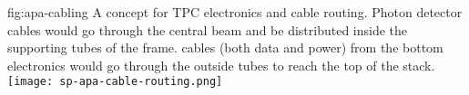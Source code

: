 \begin{dunefigure}{fig:apa-cabling}
{%
A concept for TPC electronics and  cable routing. Photon detector cables would go through the central beam and be distributed inside the supporting tubes of the  frame.   cables (both data and power) from the bottom  electronics would go through the outside tubes to reach the top of the stack.}
\texttt{[image: sp-apa-cable-routing.png]}
\end{dunefigure}


